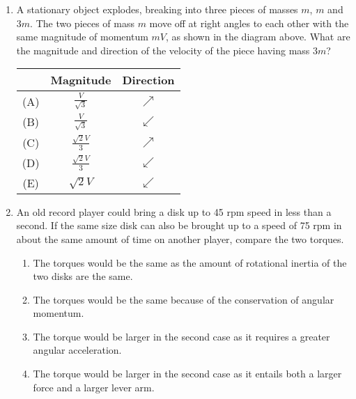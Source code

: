 \documentclass[11pt]{article}
\begin{document}
\begin{multicols}{2}
\begin{enumerate}[leftmargin=18pt,resume]
    \begin{center}
    \end{center}
  \item A stationary object explodes, breaking into three pieces of masses $m$,
    $m$ and $3m$. The two pieces of mass $m$ move off at right angles to each
    other with the same magnitude of momentum $mV$, as shown in the diagram
    above. What are the magnitude and direction of the velocity of the piece
    having mass $3m$?

    \begin{tabular}{ccc}
      & Magnitude & Direction \\
      \hline
      (A) & $\displaystyle\frac{V}{\sqrt{3}}$ & $\nearrow$ \\
      (B) & $\displaystyle\frac{V}{\sqrt{3}}$ & $\swarrow$ \\
      (C) & $\displaystyle\frac{\sqrt{2}V}{3}$ & $\nearrow$ \\
      (D) & $\displaystyle\frac{\sqrt{2}V}{3}$ & $\swarrow$ \\
      (E) & $\displaystyle\sqrt{2}V$ & $\swarrow$ \\
    \end{tabular}
    \vspace{.7in}
    
  \item An old record player could bring a disk up to 45 rpm speed in less than
    a second. If the same size disk can also be brought up to a speed of 75 rpm
    in about the same amount of time on another player, compare the two torques.
    \begin{enumerate}[nosep,leftmargin=18pt,label=(\Alph*)]
    \item The torques would be the same as the amount of rotational inertia of
      the two disks are the same.
    \item The torques would be the same because of the conservation of angular
      momentum.
    \item The torque would be larger in the second case as it requires a
      greater angular acceleration.
    \item The torque would be larger in the second case as it entails both a
      larger force and a larger lever arm.
    \end{enumerate}
    \vspace{.7in}
    

\end{enumerate}
\end{multicols}
\end{document}

